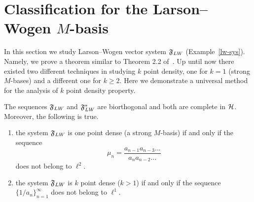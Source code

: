 \section{Classification for the Larson--Wogen $M$-basis}
  \label{section:lw-sys}
  In this section we study Larson--Wogen vector system $\fsys_{LW}$ (Example~\ref{lw-sys}).
  Namely, we prove a theorem similar to Theorem 2.2 of~\cite{katavolos}.
  Up until now there existed two different techniques in studying $k$ point density, one for $k=1$ (strong $M$-bases)
    and a different one for $k\geq2$.
  Here we demonstrate a universal method for the analysis of $k$ point density property.
  \begin{theorem}
    \label{thm:katavolos}
    The sequences $\fsys_{LW}$ and $\fsys_{LW}^*$ are biorthogonal and both are complete in $\cal{H}$.
    Moreover, the following is true.
    \begin{enumerate}
      \item  the system $\fsys_{LW}$ is one point dense (a strong $M$-basis) if and only if the sequence
        \begin{equation}
          \mu_n = \frac{a_{n-1} a_{n-3} \dots}{a_{n} a_{n-2} \dots }
        \end{equation}
        does not belong to $\ell^2$.
      \item the system $\fsys_{LW}$ is $k$ point dense ($k > 1$) if and only if the sequence $\{1/a_n\}_{n=1}^\infty$ does not belong to $\ell^1$.
    \end{enumerate}
  \end{theorem}
